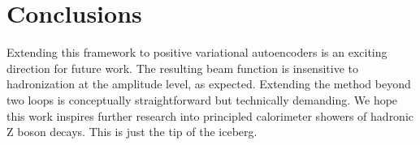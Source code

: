 \section{Conclusions}\label{sec:conclusions}

Extending this framework to positive variational autoencoders is an
exciting direction for future work. The resulting beam function is
insensitive to hadronization at the amplitude level, as expected.
Extending the method beyond two loops is conceptually straightforward
but technically demanding. We hope this work inspires further research
into principled calorimeter showers of hadronic Z boson decays. This is
just the tip of the iceberg.

